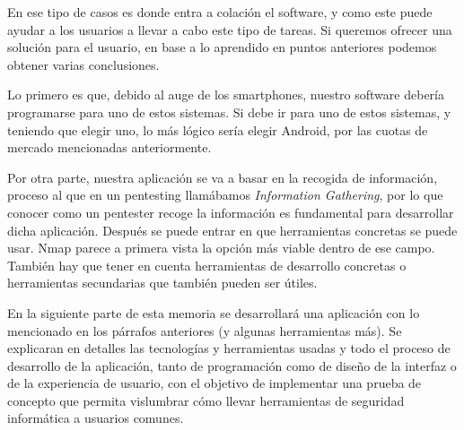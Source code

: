 En ese tipo de casos es donde entra a colación el software, y como este puede ayudar a los usuarios a llevar a cabo este tipo de tareas. Si queremos ofrecer una solución para el usuario, en base a lo aprendido en puntos anteriores podemos obtener varias conclusiones. 

Lo primero es que, debido al auge de los smartphones, nuestro software debería programarse para uno de estos sistemas. Si debe ir para uno de estos sistemas, y teniendo que elegir uno, lo más lógico sería elegir Android, por las cuotas de mercado mencionadas anteriormente. 

Por otra parte, nuestra aplicación se va a basar en la recogida de información, proceso al que en un pentesting llamábamos \textit{Information Gathering}, por lo que conocer como un pentester recoge la información es fundamental para desarrollar dicha aplicación. Después se puede entrar en que herramientas concretas se puede usar. Nmap parece a primera vista la opción más viable dentro de ese campo. También hay que tener en cuenta herramientas de desarrollo concretas o herramientas secundarias que también pueden ser útiles.

En la siguiente parte de esta memoria se desarrollará una aplicación con lo mencionado en los párrafos anteriores (y algunas herramientas más). Se explicaran en detalles las tecnologías y herramientas usadas y todo el proceso de desarrollo de la aplicación, tanto de programación como de diseño de la interfaz o de la experiencia de usuario, con el objetivo de implementar una prueba de concepto que permita vislumbrar cómo llevar herramientas de seguridad informática a usuarios comunes.